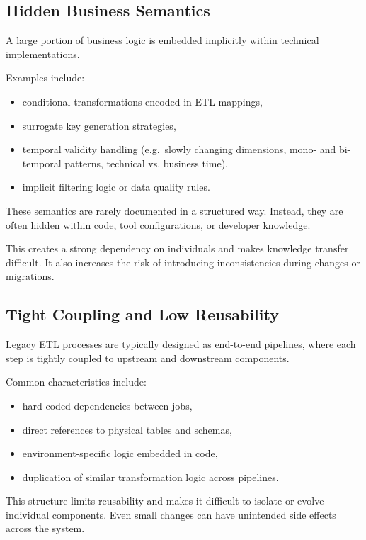 \documentclass[11pt,a4paper]{article}
\begin{document}
\subsection{Hidden Business Semantics}

A large portion of business logic is embedded implicitly within technical implementations.

Examples include:
\begin{itemize}
  \item conditional transformations encoded in ETL mappings,
  \item surrogate key generation strategies,
  \item temporal validity handling (e.g.\ slowly changing dimensions, mono- and bi-temporal patterns, technical vs. business time),
  \item implicit filtering logic or data quality rules.
\end{itemize}

These semantics are rarely documented in a structured way. Instead, they are often hidden within code, tool configurations, or developer knowledge.

This creates a strong dependency on individuals and makes knowledge transfer difficult. It also increases the risk of introducing inconsistencies during changes or migrations.

\subsection{Tight Coupling and Low Reusability}

Legacy ETL processes are typically designed as end-to-end pipelines, where each step is tightly coupled to upstream and downstream components.

Common characteristics include:
\begin{itemize}
  \item hard-coded dependencies between jobs,
  \item direct references to physical tables and schemas,
  \item environment-specific logic embedded in code,
  \item duplication of similar transformation logic across pipelines.
\end{itemize}

This structure limits reusability and makes it difficult to isolate or evolve individual components. Even small changes can have unintended side effects across the system.
\end{document}
